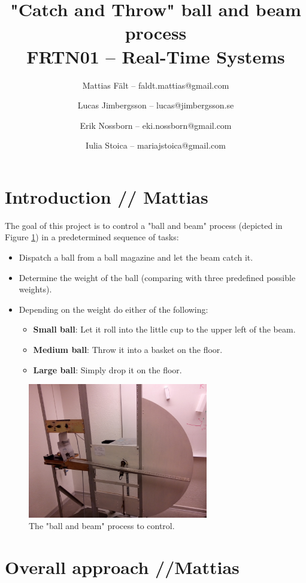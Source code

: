 \documentclass{article}
\title{"Catch and Throw" ball and beam process\\FRTN01 -- Real-Time Systems}
\author{
Mattias Fält -- faldt.mattias@gmail.com
\and
Lucas Jimbergsson -- lucas@jimbergsson.se
\and
Erik Nossborn -- eki.nossborn@gmail.com
\and
Iulia Stoica -- mariajstoica@gmail.com
}
\begin{document}
\maketitle
\newpage

\tableofcontents
\newpage

\section{Introduction // Mattias}
\label{sec:introduction}
The goal of this project is to control a "ball and beam" process (depicted in Figure \ref{fig:process}) in a predetermined sequence of tasks:
\begin{itemize}
\item Dispatch a ball from a ball magazine and let the beam catch it.
\item Determine the weight of the ball (comparing with three predefined possible weights).
\item Depending on the weight do either of the following:
\begin{itemize}
\item \textbf{Small ball}: Let it roll into the little cup to the upper left of the beam.
\item \textbf{Medium ball}: Throw it into a basket on the floor.
\item \textbf{Large ball}: Simply drop it on the floor.
\end{itemize}
\end{itemize}
\begin{figure}
\centering
\includegraphics[width=0.7\textwidth]{figures/process_fig.jpg}
\caption{The "ball and beam" process to control.}\label{fig:process}
\end{figure}

\section{Overall approach //Mattias}

\end{document}

